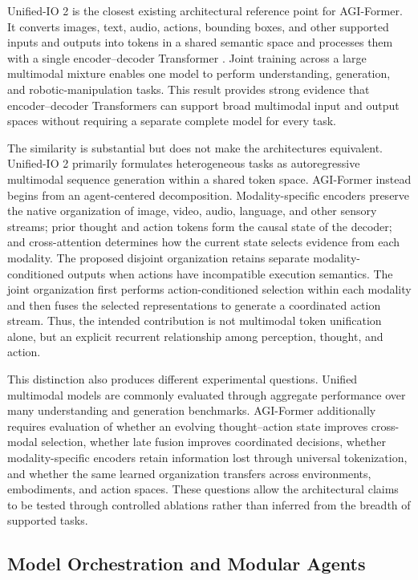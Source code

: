 Unified-IO 2 is the closest existing architectural reference point for AGI-Former. It converts images, text, audio, actions, bounding boxes, and other supported inputs and outputs into tokens in a shared semantic space and processes them with a single encoder--decoder Transformer \cite{lu2024unifiedio2}. Joint training across a large multimodal mixture enables one model to perform understanding, generation, and robotic-manipulation tasks. This result provides strong evidence that encoder--decoder Transformers can support broad multimodal input and output spaces without requiring a separate complete model for every task.

The similarity is substantial but does not make the architectures equivalent. Unified-IO 2 primarily formulates heterogeneous tasks as autoregressive multimodal sequence generation within a shared token space. AGI-Former instead begins from an agent-centered decomposition. Modality-specific encoders preserve the native organization of image, video, audio, language, and other sensory streams; prior thought and action tokens form the causal state of the decoder; and cross-attention determines how the current state selects evidence from each modality. The proposed disjoint organization retains separate modality-conditioned outputs when actions have incompatible execution semantics. The joint organization first performs action-conditioned selection within each modality and then fuses the selected representations to generate a coordinated action stream. Thus, the intended contribution is not multimodal token unification alone, but an explicit recurrent relationship among perception, thought, and action.

This distinction also produces different experimental questions. Unified multimodal models are commonly evaluated through aggregate performance over many understanding and generation benchmarks. AGI-Former additionally requires evaluation of whether an evolving thought--action state improves cross-modal selection, whether late fusion improves coordinated decisions, whether modality-specific encoders retain information lost through universal tokenization, and whether the same learned organization transfers across environments, embodiments, and action spaces. These questions allow the architectural claims to be tested through controlled ablations rather than inferred from the breadth of supported tasks.

\subsection{\textbf{Model Orchestration and Modular Agents}}

